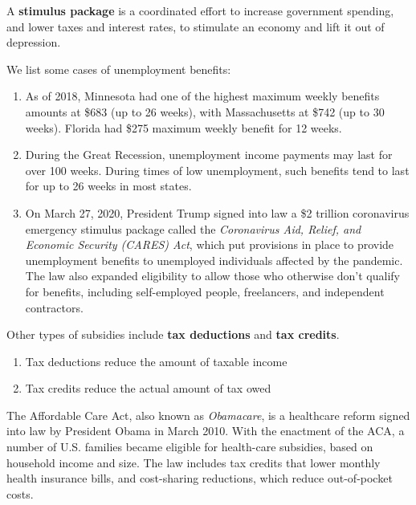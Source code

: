 \documentclass{article}
\begin{document}
  \begin{definition}
    A \textbf{stimulus package} is a coordinated effort to increase government spending, and lower taxes and interest rates, to stimulate an economy and lift it out of depression. 
  \end{definition}

  \begin{example}
    We list some cases of unemployment benefits:
    \begin{enumerate}
      \item As of 2018, Minnesota had one of the highest maximum weekly benefits amounts at \$683 (up to 26 weeks), with Massachusetts at \$742 (up to 30 weeks). Florida had \$275 maximum weekly benefit for 12 weeks. 
      \item During the Great Recession, unemployment income payments may last for over 100 weeks. During times of low unemployment, such benefits tend to last for up to 26 weeks in most states. 
      \item On March 27, 2020, President Trump signed into law a \$2 trillion coronavirus emergency stimulus package called the \textit{Coronavirus Aid, Relief, and Economic Security (CARES) Act}, which put provisions in place to provide unemployment benefits to unemployed individuals affected by the pandemic. The law also expanded eligibility to allow those who otherwise don't qualify for benefits, including self-employed people, freelancers, and independent contractors. 
    \end{enumerate}
  \end{example}

  \begin{definition}
    Other types of subsidies include \textbf{tax deductions} and \textbf{tax credits}. \begin{enumerate}
      \item Tax deductions reduce the amount of taxable income
      \item Tax credits reduce the actual amount of tax owed
    \end{enumerate}
  \end{definition}

  \begin{example}
    The Affordable Care Act, also known as \textit{Obamacare}, is a healthcare reform signed into law by President Obama in March 2010. With the enactment of the ACA, a number of U.S. families became eligible for health-care subsidies, based on household income and size.  The law includes tax credits that lower monthly health insurance bills, and cost-sharing reductions, which reduce out-of-pocket costs. 
  \end{example}
\end{document}
